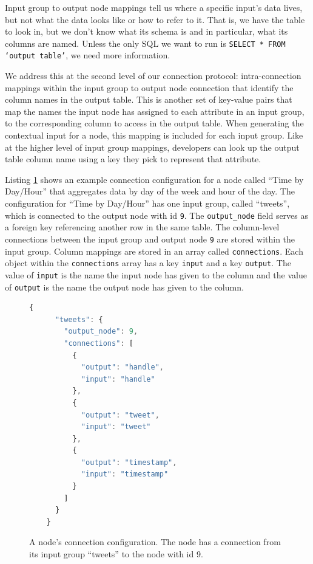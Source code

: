 \documentclass[midd]{thesis}
\begin{document}
Input group to output node mappings tell us where a specific input's data lives,
but not what the data looks like or how to refer to it. That is, we have the
table to look in, but we don't know what its schema is and in particular, what
its columns are named. Unless the only SQL we want to run is \texttt{SELECT *
FROM `output table'}, we need more information.

We address this at the second level of our connection protocol: intra-connection
mappings within the input group to output node connection that identify the
column names in the output table. This is another set of key-value pairs that
map the names the input node has assigned to each attribute in an input group,
to the corresponding column to access in the output table. When generating the
contextual input for a node, this mapping is included for each input group. Like
at the higher level of input group mappings, developers can look up the
output table column name using a key they pick to represent that attribute.

Listing \ref{lst:connectionjson} shows an example connection configuration for a
node called ``Time by Day/Hour'' that aggregates data by day of the week and
hour of the day. The configuration for ``Time by Day/Hour'' has one input group,
called ``tweets'', which is connected to the output node with id \texttt{9}. The
\texttt{output\_node} field serves as a foreign key referencing another row in
the same table. The column-level connections between the input group and output
node \texttt{9} are stored within the input group. Column mappings are stored in
an array called \texttt{connections}. Each object within the
\texttt{connections} array has a key \texttt{input} and a key
\texttt{output}. The value of \texttt{input} is the name the input node has
given to the column and the value of \texttt{output} is the name the output node
has given to the column.

\begin{figure}[!ht]
  \begin{lstlisting}[language=javascript, gobble=4]
    {
      "tweets": {
        "output_node": 9,
        "connections": [
          {
            "output": "handle",
            "input": "handle"
          },
          {
            "output": "tweet",
            "input": "tweet"
          },
          {
            "output": "timestamp",
            "input": "timestamp"
          }
        ]
      }
    }
  \end{lstlisting}
  \caption[The connection configuration for a node.]{A node's connection
  configuration. The node has a connection from its input group ``tweets'' to
  the node with id 9.}
  \label{lst:connectionjson}
\end{figure}
\end{document}

